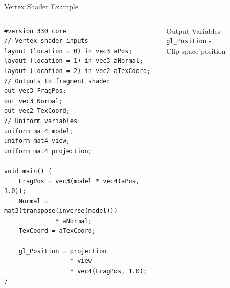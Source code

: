 \begin{frame}[fragile]{Vertex Shader Example}
  \begin{columns}
    \begin{column}{0.6\textwidth}
      \begin{verbatim}
#version 330 core
// Vertex shader inputs
layout (location = 0) in vec3 aPos;
layout (location = 1) in vec3 aNormal;
layout (location = 2) in vec2 aTexCoord;
// Outputs to fragment shader
out vec3 FragPos;
out vec3 Normal;
out vec2 TexCoord;
// Uniform variables
uniform mat4 model;
uniform mat4 view;
uniform mat4 projection;

void main() {
    FragPos = vec3(model * vec4(aPos, 1.0));
    Normal = mat3(transpose(inverse(model)))
              * aNormal;
    TexCoord = aTexCoord;

    gl_Position = projection
                  * view
                  * vec4(FragPos, 1.0);
}
      \end{verbatim}
    \end{column}
    \begin{column}{0.4\textwidth}
      \begin{conceptbox}{Output Variables}
        \texttt{\textcolor{PrimaryColor}{gl\_Position}} - \\ Clip space position
      \end{conceptbox}
    \end{column}
  \end{columns}
\end{frame}

